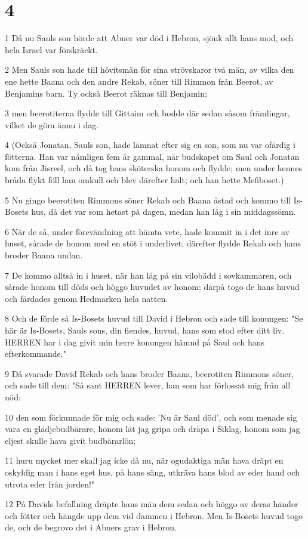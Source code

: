 \chapter{4}

\par 1 Då nu Sauls son hörde att Abner var död i Hebron, sjönk allt hans mod, och hela Israel var förskräckt.
\par 2 Men Sauls son hade till hövitsmän för sina strövskaror två män, av vilka den ene hette Baana och den andre Rekab, söner till Rimmon från Beerot, av Benjamins barn. Ty också Beerot räknas till Benjamin;
\par 3 men beerotiterna flydde till Gittaim och bodde där sedan såsom främlingar, vilket de göra ännu i dag.
\par 4 (Också Jonatan, Sauls son, hade lämnat efter sig en son, som nu var ofärdig i fötterna. Han var nämligen fem år gammal, när budskapet om Saul och Jonatan kom från Jisreel, och då tog hans sköterska honom och flydde; men under hennes bråda flykt föll han omkull och blev därefter halt; och han hette Mefiboset.)
\par 5 Nu gingo beerotiten Rimmons söner Rekab och Baana åstad och kommo till Is-Bosets hus, då det var som hetast på dagen, medan han låg i sin middagssömn.
\par 6 När de så, under förevändning att hämta vete, hade kommit in i det inre av huset, sårade de honom med en stöt i underlivet; därefter flydde Rekab och hans broder Baana undan.
\par 7 De kommo alltså in i huset, när han låg på sin vilobädd i sovkammaren, och sårade honom till döds och höggo huvudet av honom; därpå togo de hans huvud och färdades genom Hedmarken hela natten.
\par 8 Och de förde så Is-Bosets huvud till David i Hebron och sade till konungen: "Se här är Is-Bosets, Sauls sons, din fiendes, huvud, hans som stod efter ditt liv. HERREN har i dag givit min herre konungen hämnd på Saul och hans efterkommande."
\par 9 Då svarade David Rekab och hans broder Baana, beerotiten Rimmons söner, och sade till dem: "Så sant HERREN lever, han som har förlossat mig från all nöd:
\par 10 den som förkunnade för mig och sade: 'Nu är Saul död', och som menade sig vara en glädjebudbärare, honom lät jag gripa och dräpa i Siklag, honom som jag eljest skulle hava givit budbärarlön;
\par 11 huru mycket mer skall jag icke då nu, när ogudaktiga män hava dräpt en oskyldig man i hans eget hus, på hans säng, utkräva hans blod av eder hand och utrota eder från jorden!"
\par 12 På Davids befallning dräpte hans män dem sedan och höggo av deras händer och fötter och hängde upp dem vid dammen i Hebron. Men Is-Bosets huvud togo de, och de begrovo det i Abners grav i Hebron.

